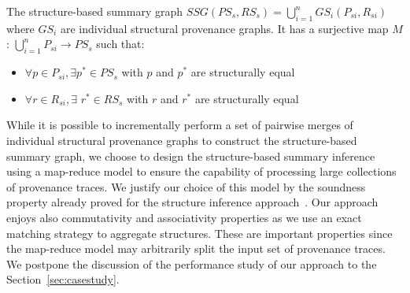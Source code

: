 \begin{lemma} 
\label{prop:sum-graph}
The structure-based summary graph $SSG(PS_s, RS_s)=  \bigcup_{i=1}^n  GS_i(P_{si}, R_{si})$ where $GS_i$ are individual structural provenance graphs.
It has a surjective map $M$: $ \bigcup_{i=1}^n P_{si} \longrightarrow PS_s$ such that:\begin{itemize}[noitemsep]
\item  $\forall p\in P_{si}, \exists p^*\in PS_s$ with $p$ and $p^*$ are structurally equal
\item  $\forall r \in R_{si},  \exists$ $r^* \in RS_s$ with $r$ and $r^*$ are structurally equal
\end{itemize}
\end{lemma}
While it is possible to incrementally perform a set of pairwise merges of individual structural provenance graphs to construct the structure-based summary graph, we choose to design the structure-based summary inference using a map-reduce model to ensure the capability of processing large collections of provenance traces. 
We justify our choice of this model by the soundness property already proved for the structure inference approach~\cite{baazizi2017}. Our approach enjoys also commutativity and associativity properties as we use an exact matching strategy to aggregate structures.  These are important properties since the map-reduce model may arbitrarily split the input set of provenance traces.
We postpone the discussion of the performance study of our approach to the Section~\ref{sec:casestudy}.



